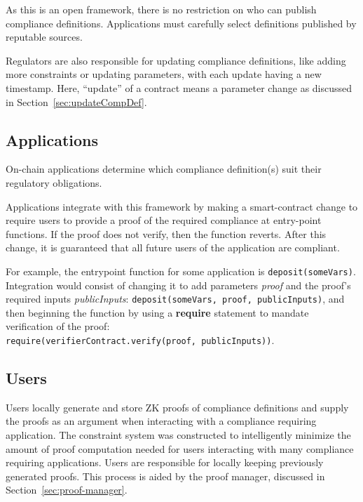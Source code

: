 \documentclass[9pt]{extreport}
\begin{document}
As this is an open framework, there is no restriction on who can publish compliance definitions.  Applications must carefully select definitions published by reputable sources.

Regulators are also responsible for updating compliance definitions, like adding more constraints or updating parameters, with each update having a new
timestamp.  Here, ``update'' of a contract means a parameter change as
discussed in Section~\ref{sec:updateCompDef}.

\subsection{Applications}

On-chain applications determine which compliance definition(s) suit their regulatory obligations.

Applications integrate with this framework by making a smart-contract change to require users to provide a proof of the required compliance at entry-point functions.  If the proof does not verify, then the function reverts.  After this change, it is guaranteed that all future users of the application are compliant.

For example, the entrypoint function for some application is \texttt{deposit(someVars)}.  Integration would consist of changing it to add parameters \textit{proof} and the proof's required inputs \textit{publicInputs}: \texttt{deposit(someVars, proof, publicInputs)}, and then beginning the function by using a \textbf{require} statement to mandate verification of the proof:\\ \texttt{require(verifierContract.verify(proof, publicInputs))}.

\subsection{Users}

Users locally generate and store ZK proofs of compliance definitions and supply the proofs as an argument when interacting with a compliance requiring application.  The constraint system was constructed to intelligently minimize the amount of proof computation needed for users interacting with many compliance requiring applications.  Users are responsible for locally keeping previously generated proofs.  This process is aided by the proof manager, discussed in Section~\ref{sec:proof-manager}.
\end{document}
